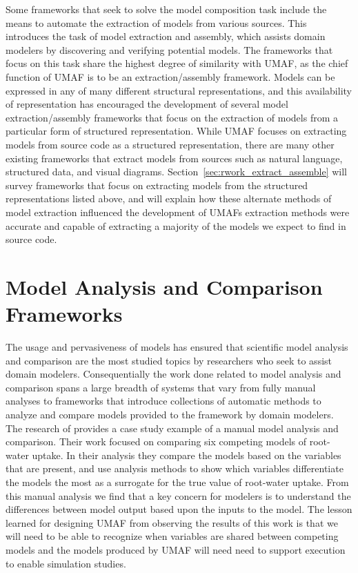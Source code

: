 Some frameworks that seek to solve the model composition task include the means to automate the extraction of models from various sources.
This introduces the task of model extraction and assembly, which assists domain modelers by discovering and verifying potential models.
The frameworks that focus on this task share the highest degree of similarity with UMAF, as the chief function of UMAF is to be an extraction/assembly framework.
Models can be expressed in any of many different structural representations, and this availability of representation has encouraged the development of several model extraction/assembly frameworks that focus on the extraction of models from a particular form of structured representation.
While UMAF focuses on extracting models from source code as a structured representation, there are many other existing frameworks that extract models from sources such as natural language, structured data, and visual diagrams.
Section~\ref{sec:rwork_extract_assemble} will survey frameworks that focus on extracting models from the structured representations listed above, and will explain how these alternate methods of model extraction influenced the development of UMAFs extraction methods were accurate and capable of extracting a majority of the models we expect to find in source code.


\section{Model Analysis and Comparison Frameworks \label{sec:rwork_analysis_compare}}
The usage and pervasiveness of models has ensured that scientific model analysis and comparison are the most studied topics by researchers who seek to assist domain modelers.
Consequentially the work done related to model analysis and comparison spans a large breadth of systems that vary from fully manual analyses to frameworks that introduce collections of automatic methods to analyze and compare models provided to the framework by domain modelers.
The research of \citet{camargo2016six} provides a case study example of a manual model analysis and comparison.
Their work focused on comparing six competing models of root-water uptake.
In their analysis they compare the models based on the variables that are present, and use analysis methods to show which variables differentiate the models the most as a surrogate for the true value of root-water uptake.
From this manual analysis we find that a key concern for modelers is to understand the differences between model output based upon the inputs to the model.
The lesson learned for designing UMAF from observing the results of this work is that we will need to be able to recognize when variables are shared between competing models and the models produced by UMAF will need need to support execution to enable simulation studies.

